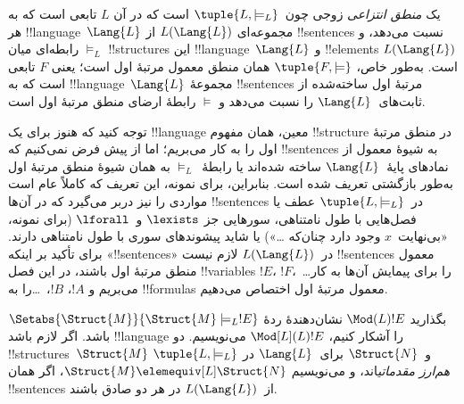 \documentclass[../../../include/open-logic-section]{subfiles}
\begin{document}

\begin{defn}
یک
\emph{منطق انتزاعی} زوجی چون~$\tuple{L, \models_L}$ است که در آن
$L$ تابعی است که به هر !!{language}~$\Lang{L}$ مجموعه‌ای
$L(\Lang{L})$ از !!{sentence}s نسبت می‌دهد، و $\models_L$ رابطه‌ای
میان !!{structure}s این !!{language}~$\Lang{L}$ و !!{element}s
$L(\Lang{L})$ است. به‌طور خاص، $\tuple{F, \models}$ همان منطق معمول
مرتبهٔ اول است؛ یعنی $F$ تابعی است که به !!{language}~$\Lang{L}$
مجموعهٔ !!{sentence}s مرتبهٔ اول ساخته‌شده از ثابت‌های~$\Lang{L}$ را
نسبت می‌دهد و $\models$ رابطهٔ ارضای منطق مرتبهٔ اول است.
\end{defn}

توجه کنید که هنوز برای یک !!{language} معین، همان مفهوم
!!{structure} در منطق مرتبهٔ اول را به کار می‌بریم؛ اما از پیش فرض
نمی‌کنیم که !!{sentence}s به شیوهٔ معمول از نمادهای پایهٔ~$\Lang{L}$
ساخته شده‌اند یا رابطهٔ~$\models_L$ به همان شیوهٔ منطق مرتبهٔ اول
به‌طور بازگشتی تعریف شده است. بنابراین، برای نمونه، این تعریف که
کاملاً عام است مواردی را نیز دربر می‌گیرد که در آن‌ها !!{sentence}s
در~$\tuple{L,\models_L}$ عطف یا فصل‌هایی با طول نامتناهی، سورهایی جز
$\lexists$ و~$\lforall$ (برای نمونه، «بی‌نهایت~$x$ وجود دارد چنان‌که
\dots») یا شاید پیشوندهای سوری با طول نامتناهی دارند. برای تأکید بر
اینکه «!!{sentence}s» در~$L(\Lang{L})$ لازم نیست !!{sentence}s معمول
منطق مرتبهٔ اول باشند، در این فصل !!{variable}s
$!E$، $!F$،~\dots را برای پیمایش آن‌ها به کار می‌بریم و
$!A$، $!B$،~\dots را به !!{formula}s معمول مرتبهٔ اول اختصاص می‌دهیم.

\begin{defn}
بگذارید $\Mod(L){!E}$ نشان‌دهندهٔ ردهٔ
$\Setabs{\Struct{M}}{\Struct{M} \models_L !E}$ باشد. اگر لازم باشد
!!{language} را آشکار کنیم، $\Mod[L](L){!E}$ می‌نویسیم. دو
!!{structure}s~$\Struct{M}$ و~$\Struct{N}$ برای~$\Lang{L}$ در
$\tuple{L, \models_L}$
\emph{هم‌ارز مقدماتی}اند، و می‌نویسیم
$\Struct{M} \elemequiv[L] \Struct{N}$، اگر همان !!{sentence}s
از~$L(\Lang{L})$ در هر دو صادق باشند.
\end{defn}
\end{document}
